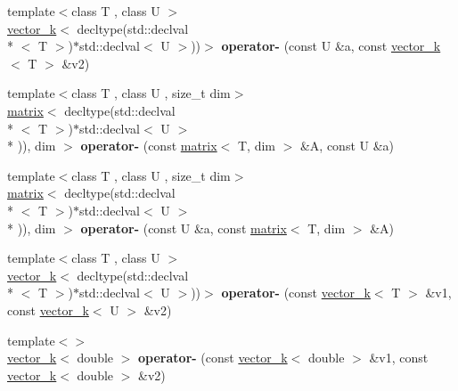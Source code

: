 \begin{DoxyCompactItemize}
\item 
\hypertarget{namespacekeycpp_a1222c1fe6037feb8eacf0d2bd5152751}{{\footnotesize template$<$class T , class U $>$ }\\\hyperlink{classkeycpp_1_1vector__k}{vector\-\_\-k}$<$ decltype(std\-::declval\\*
$<$ T $>$)$\ast$std\-::declval$<$ U $>$))$>$ {\bfseries operator-\/} (const U \&a, const \hyperlink{classkeycpp_1_1vector__k}{vector\-\_\-k}$<$ T $>$ \&v2)}\label{namespacekeycpp_a1222c1fe6037feb8eacf0d2bd5152751}

\item 
\hypertarget{namespacekeycpp_af05e48a344f24985b26ddcd3584c6b3f}{{\footnotesize template$<$class T , class U , size\-\_\-t dim$>$ }\\\hyperlink{classkeycpp_1_1matrix}{matrix}$<$ decltype(std\-::declval\\*
$<$ T $>$)$\ast$std\-::declval$<$ U $>$\\*
)), dim $>$ {\bfseries operator-\/} (const \hyperlink{classkeycpp_1_1matrix}{matrix}$<$ T, dim $>$ \&A, const U \&a)}\label{namespacekeycpp_af05e48a344f24985b26ddcd3584c6b3f}

\item 
\hypertarget{namespacekeycpp_aaca75edcfed33360ce11172c32968d04}{{\footnotesize template$<$class T , class U , size\-\_\-t dim$>$ }\\\hyperlink{classkeycpp_1_1matrix}{matrix}$<$ decltype(std\-::declval\\*
$<$ T $>$)$\ast$std\-::declval$<$ U $>$\\*
)), dim $>$ {\bfseries operator-\/} (const U \&a, const \hyperlink{classkeycpp_1_1matrix}{matrix}$<$ T, dim $>$ \&A)}\label{namespacekeycpp_aaca75edcfed33360ce11172c32968d04}

\item 
\hypertarget{namespacekeycpp_a891589b60d1c968b44986f3b7d56586b}{{\footnotesize template$<$class T , class U $>$ }\\\hyperlink{classkeycpp_1_1vector__k}{vector\-\_\-k}$<$ decltype(std\-::declval\\*
$<$ T $>$)$\ast$std\-::declval$<$ U $>$))$>$ {\bfseries operator-\/} (const \hyperlink{classkeycpp_1_1vector__k}{vector\-\_\-k}$<$ T $>$ \&v1, const \hyperlink{classkeycpp_1_1vector__k}{vector\-\_\-k}$<$ U $>$ \&v2)}\label{namespacekeycpp_a891589b60d1c968b44986f3b7d56586b}

\item 
\hypertarget{namespacekeycpp_a2a6e4104db7159c74673aacae14286ef}{{\footnotesize template$<$$>$ }\\\hyperlink{classkeycpp_1_1vector__k}{vector\-\_\-k}$<$ double $>$ {\bfseries operator-\/} (const \hyperlink{classkeycpp_1_1vector__k}{vector\-\_\-k}$<$ double $>$ \&v1, const \hyperlink{classkeycpp_1_1vector__k}{vector\-\_\-k}$<$ double $>$ \&v2)}\label{namespacekeycpp_a2a6e4104db7159c74673aacae14286ef}


\end{DoxyCompactItemize}
